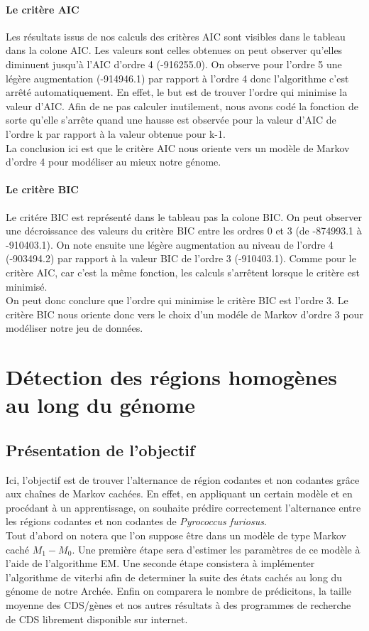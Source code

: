 \documentclass[12pt,a4paper]{article}
\begin{document}
\paragraph{Le critère AIC}
Les résultats issus de nos calculs des critères AIC sont visibles dans le tableau dans la colone AIC. Les valeurs sont celles obtenues  on peut observer qu'elles diminuent jusqu'à l'AIC d'ordre 4 (-916255.0). On observe pour l'ordre 5 une légère augmentation (-914946.1) par rapport à l'ordre 4 donc l'algorithme c'est arrêté automatiquement. En effet, le but est de trouver l'ordre qui minimise la valeur d'AIC. Afin de ne pas calculer inutilement, nous avons codé la fonction de sorte qu'elle s'arrête quand une hausse est observée pour la valeur d'AIC de l'ordre k par rapport à la valeur obtenue pour k-1.
\\ \indent
La conclusion ici est que le critère AIC nous oriente vers un modèle de Markov d'ordre 4 pour modéliser au mieux notre génome.
\paragraph{Le critère BIC}
Le critére BIC est représenté dans le tableau pas la colone BIC. On peut observer une décroissance des valeurs du critère BIC entre les ordres 0 et 3 (de -874993.1 à -910403.1). On note ensuite une légère augmentation au niveau de l'ordre 4 (-903494.2) par rapport à la valeur BIC de l'ordre 3 (-910403.1). Comme pour le critère AIC, car c'est la même fonction, les calculs s'arrêtent lorsque le critère est minimisé.
\\ \indent
On peut donc conclure que l'ordre qui minimise le critère BIC est l'ordre 3. Le critère BIC nous oriente donc vers le choix d'un modéle de Markov d'ordre 3 pour modéliser notre jeu de données.

\section{Détection des régions homogènes au long du génome}
\subsection{Présentation de l'objectif}
Ici, l'objectif est de trouver l'alternance de région codantes et non codantes grâce aux chaînes de Markov cachées. En effet, en appliquant un certain modèle et en procédant à un apprentissage, on souhaite prédire correctement l'alternance entre les régions codantes et non codantes de \textit{Pyrococcus furiosus}.
\\ \indent
Tout d'abord on notera que l'on suppose être dans un modèle de type Markov caché $M_1-M_0$. 
Une première étape sera d'estimer les paramètres de ce modèle à l'aide de l'algorithme EM. 
Une seconde étape consistera à implémenter l'algorithme de viterbi afin de determiner la suite des états cachés au long du génome de notre Archée. 
Enfin on comparera le nombre de prédicitons, la taille moyenne des CDS/gènes et nos autres résultats à des programmes de recherche de CDS librement disponible sur internet.
\end{document}
